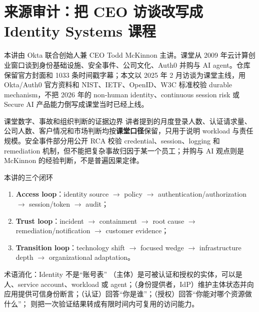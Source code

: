 \documentclass[a4paper]{article}
\begin{document}
\makecscover

\section{来源审计：把 CEO 访谈改写成 Identity Systems 课程}

本讲由 Okta 联合创始人兼 CEO Todd McKinnon 主讲。课堂从 2009 年云计算创业窗口谈到身份基础设施、安全事件、公司文化、Auth0 并购与 AI agent。仓库保留官方封面和 1033 条时间戳字幕；本文以 2025 年 2 月访谈为课堂主线，用 Okta/Auth0 官方资料和 NIST、IETF、OpenID、W3C 标准校验 durable mechanism，不把 2026 年的 non-human identity、continuous session risk 或 Secure AI 产品能力倒写成课堂当时已经上线。

\begin{warningbox}{课堂数字、事故和组织判断的证据边界}
讲者提到的月度登录人数、认证请求量、公司人数、客户情况和市场判断均按\textbf{课堂口径}保留，只用于说明 workload 与责任规模。安全事件部分用公开 RCA 校验 credential、session、logging 和 remediation 机制，但不能把复杂事故归因于某一个员工；并购与 AI 观点则是 McKinnon 的经验判断，不是普遍因果定律。
\end{warningbox}

\begin{importantbox}{本讲的三个闭环}
\begin{enumerate}
  \item \textbf{Access loop}：identity source $\rightarrow$ policy $\rightarrow$ authentication/authorization $\rightarrow$ session/token $\rightarrow$ audit；
  \item \textbf{Trust loop}：incident $\rightarrow$ containment $\rightarrow$ root cause $\rightarrow$ remediation/notification $\rightarrow$ customer evidence；
  \item \textbf{Transition loop}：technology shift $\rightarrow$ focused wedge $\rightarrow$ infrastructure depth $\rightarrow$ organizational adaptation。
\end{enumerate}
\end{importantbox}

\begin{knowledgebox}{术语消化：Identity 不是“账号表”}
（主体）是可被认证和授权的实体，可以是人、service account、workload 或 agent；（身份提供者，IdP）维护主体状态并向应用提供可信身份断言；（认证）回答“你是谁”；（授权）回答“你能对哪个资源做什么”； 则把一次验证结果转成有限时间内可复用的访问能力。
\end{knowledgebox}
\end{document}
